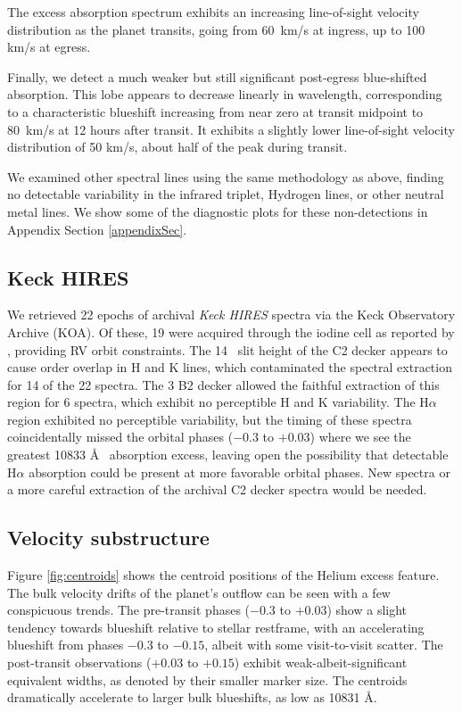 \documentclass[twocolumn]{aastex631}
\begin{document}
The excess absorption spectrum exhibits an increasing line-of-sight velocity distribution as the planet transits, going from 60~km/s at ingress, up to 100 km/s at egress.

Finally, we detect a much weaker but still significant post-egress blue-shifted absorption.  This lobe appears to decrease linearly in wavelength, corresponding to a characteristic blueshift increasing from near zero at transit midpoint to 80~km/s at 12 hours after transit.  It exhibits a slightly lower line-of-sight velocity distribution of 50 km/s, about half of the peak during transit.

We examined other spectral lines using the same methodology as above, finding no detectable variability in the  infrared triplet, Hydrogen lines, or other neutral metal lines.  We show some of the diagnostic plots for these non-detections in Appendix Section \ref{appendixSec}.



\subsection{Keck HIRES}
We retrieved 22 epochs of archival \emph{Keck HIRES} spectra via the Keck Observatory Archive (KOA). Of these, 19 were acquired through the iodine cell as reported by \citet{2017AJ....153..211Z}, providing RV orbit constraints.  The 14\arcsec~ slit height of the C2 decker appears to cause order overlap in  H and K lines, which contaminated the spectral extraction for 14 of the 22 spectra.  The 3 B2 decker allowed the faithful extraction of this region for 6 spectra, which exhibit no perceptible  H and K variability.  The H$\alpha$ region exhibited no perceptible variability, but the timing of these spectra coincidentally missed the orbital phases ($-0.3$ to $+0.03$) where we see the greatest  10833 \AA~ absorption excess, leaving open the possibility that detectable H$\alpha$ absorption could be present at more favorable orbital phases.  New spectra or a more careful extraction of the archival C2 decker spectra would be needed.


\subsection{Velocity substructure}
Figure \ref{fig:centroids} shows the centroid positions of the Helium excess feature.  The bulk velocity drifts of the planet's outflow can be seen with a few conspicuous trends.  The pre-transit phases ($-0.3$ to $+0.03$) show a slight tendency towards blueshift relative to stellar restframe, with an accelerating blueshift from phases $-0.3$ to $-0.15$, albeit with some visit-to-visit scatter.  The post-transit observations ($+0.03$ to $+0.15$) exhibit weak-albeit-significant equivalent widths, as denoted by their smaller marker size.  The centroids dramatically accelerate to larger bulk blueshifts, as low as 10831 \AA.
\end{document}

